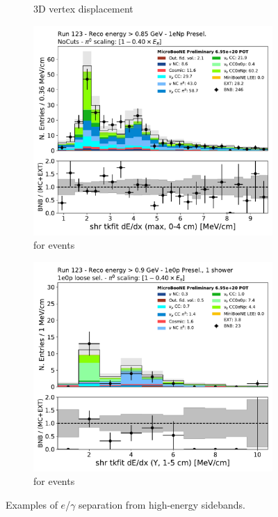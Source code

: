\begin{figure}[H]
\begin{center}
\begin{subfigure}[b]{0.45\textwidth}
    \caption{\label{fig:tkshdistancedata} 3D vertex displacement}
    \end{subfigure}
    \begin{subfigure}[b]{0.45\textwidth}
    \centering
    \includegraphics[width=1.00\textwidth]{egamma/shr_tkfit_dedx_max_run123_trkpid_lt_m01_tkshdistance_10cm.pdf}
    \caption{\label{fig:dedxdata:1enp} \dedx for \npsel events}
    \end{subfigure}
    \begin{subfigure}[b]{0.45\textwidth}
    \centering
    \includegraphics[width=1.00\textwidth]{1e0p/High_E_Sideband/loose_selection/shr_tkfit_gap10_dedx_Y.pdf}
    \caption{\label{fig:dedxdata:1e0p} \dedx for \zpsel events}
    \end{subfigure}
\caption{\label{fig:egammaseparationdata} Examples of  $e$/$\gamma$ separation from high-energy sidebands.}
\end{center}
\end{figure}

